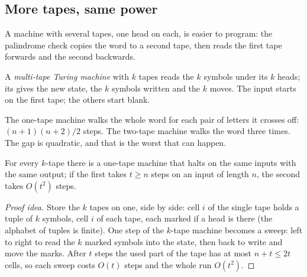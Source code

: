 \subsection{More tapes, same power}

A machine with several tapes, one head on each, is easier to program: the palindrome check copies the word to a second tape, then reads the first tape forwards and the second backwards.

\begin{definition}\label{def:b3:computability:multitape}
A \emph{multi-tape Turing machine} with $k$ tapes reads the $k$ symbols under its $k$ heads; its  gives the new state, the $k$ symbols written and the $k$ moves. The input starts on the first tape; the others start blank.
\end{definition}

\label{lst:b3:computability:multitape}

\label{out:b3:computability:multitape}

The one-tape machine walks the whole word for each pair of letters it crosses off: $(n + 1)(n + 2)/2$ steps. The two-tape machine walks the word three times. The gap is quadratic, and that is the worst that can happen.

\begin{theorem}\label{thm:b3:computability:multitape}
For every $k$-tape  there is a one-tape machine that halts on the same inputs with the same output; if the first takes $t \ge n$ steps on an input of length $n$, the second takes $O(t^2)$ steps.
\end{theorem}

\begin{proof}[Proof idea]
Store the $k$ tapes on one, side by side: cell $i$ of the single tape holds a tuple of $k$ symbols, cell $i$ of each tape, each marked if a head is there (the alphabet of tuples is finite). One step of the $k$-tape machine becomes a sweep: left to right to read the $k$ marked symbols into the state, then back to write and move the marks. After $t$ steps the used part of the tape has at most $n + t \le 2t$ cells, so each sweep costs $O(t)$ steps and the whole run $O(t^2)$.
\end{proof}

